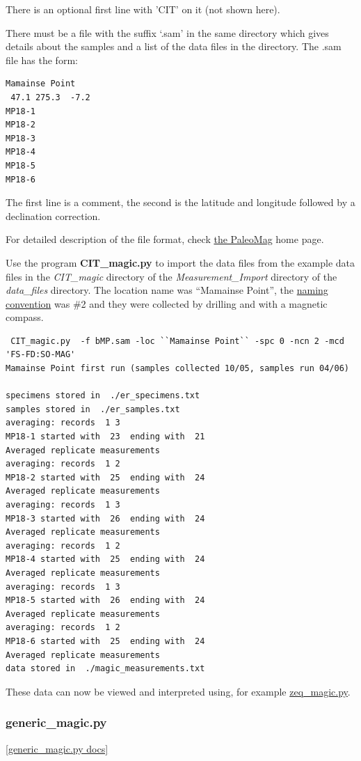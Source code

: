 \documentclass[11pt]{book}
\begin{document}
{{There is an optional first line with 'CIT' on it (not shown here).

There must be a file with the suffix `.sam' in the same directory which gives details about the samples and a list of the data files in the directory.    The .sam file has the form:

\begin{verbatim}
Mamainse Point
 47.1 275.3  -7.2
MP18-1
MP18-2
MP18-3
MP18-4
MP18-5
MP18-6
\end{verbatim}

The first line is a comment, the second is the latitude and longitude followed by a declination correction.

For detailed description of the file format, check \href{http://cires.colorado.edu/people/jones.craig/PMag3.html}{the PaleoMag} home page.

Use the program {\bf CIT\_magic.py} to import the data files from the example data files in the {\it CIT\_magic} directory of the {\it Measurement\_Import} directory of the {\it data\_files} directory.   The location name was ``Mamainse Point'', the \href{#naming_schemes}{naming convention} was \#2 and they were collected by drilling and with a magnetic compass.

\begin{verbatim}
 CIT_magic.py  -f bMP.sam -loc ``Mamainse Point`` -spc 0 -ncn 2 -mcd 'FS-FD:SO-MAG'
Mamainse Point first run (samples collected 10/05, samples run 04/06)

specimens stored in  ./er_specimens.txt
samples stored in  ./er_samples.txt
averaging: records  1 3
MP18-1 started with  23  ending with  21
Averaged replicate measurements
averaging: records  1 2
MP18-2 started with  25  ending with  24
Averaged replicate measurements
averaging: records  1 3
MP18-3 started with  26  ending with  24
Averaged replicate measurements
averaging: records  1 2
MP18-4 started with  25  ending with  24
Averaged replicate measurements
averaging: records  1 3
MP18-5 started with  26  ending with  24
Averaged replicate measurements
averaging: records  1 2
MP18-6 started with  25  ending with  24
Averaged replicate measurements
data stored in  ./magic_measurements.txt
\end{verbatim}

These data can now be viewed and interpreted using, for example \href{#zeq_magic.py}{zeq\_magic.py}.


\subsubsection{generic\_magic.py}
\href{https://github.com/PmagPy/PmagPy/blob/master/programs/generic_magic.py}{[generic\_magic.py docs]}

}}
\end{document}
